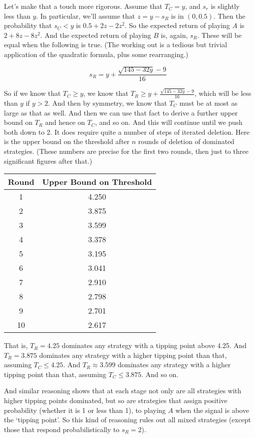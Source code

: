 \documentclass[11pt,]{book}
\def\toprule{}
\def\bottomrule{}
\def\midrule{}
\begin{document}
Let's make that a touch more rigorous. Assume that \(T_C = y\), and \(s_r\) is slightly less than \(y\). In particular, we'll assume that \(z = y - s_R\) is in \((0, 0.5)\). Then the probability that \(s_C < y\) is \(0.5 + 2z - 2z^2\). So the expected return of playing \(A\) is \(2 + 8z - 8z^2\). And the expected return of playing \(B\) is, again, \(s_R\). These will be equal when the following is true. (The working out is a tedious but trivial application of the quadratic formula, plus some rearranging.)

\[s_R = y + \frac{\sqrt{145-32y} - 9}{16}\]

So if we know that \(T_C \geq y\), we know that \(T_R \geq y + \frac{\sqrt{145-32y} - 9}{16}\), which will be less than \(y\) if \(y > 2\). And then by symmetry, we know that \(T_C\) must be at most as large as that as well. And then we can use that fact to derive a further upper bound on \(T_R\) and hence on \(T_C\), and so on. And this will continue until we push both down to 2. It does require quite a number of steps of iterated deletion. Here is the upper bound on the threshold after \(n\) rounds of deletion of dominated strategies. (These numbers are precise for the first two rounds, then just to three significant figures after that.)

\begin{longtable}[]{@{}cc@{}}
\toprule
Round & Upper Bound on Threshold\tabularnewline
\midrule
\endhead
1 & 4.250\tabularnewline
2 & 3.875\tabularnewline
3 & 3.599\tabularnewline
4 & 3.378\tabularnewline
5 & 3.195\tabularnewline
6 & 3.041\tabularnewline
7 & 2.910\tabularnewline
8 & 2.798\tabularnewline
9 & 2.701\tabularnewline
10 & 2.617\tabularnewline
\bottomrule
\end{longtable}

That is, \(T_R = 4.25\) dominates any strategy with a tipping point above 4.25. And \(T_R = 3.875\) dominates any strategy with a higher tipping point than that, assuming \(T_C \leq 4.25\). And \(T_R \approx 3.599\) dominates any strategy with a higher tipping point than that, assuming \(T_C \leq 3.875\). And so on.

And similar reasoning shows that at each stage not only are all strategies with higher tipping points dominated, but so are strategies that assign positive probability (whether it is 1 or less than 1), to playing \(A\) when the signal is above the `tipping point'. So this kind of reasoning rules out all mixed strategies (except those that respond probabilistically to \(s_R = 2\)).
\end{document}
